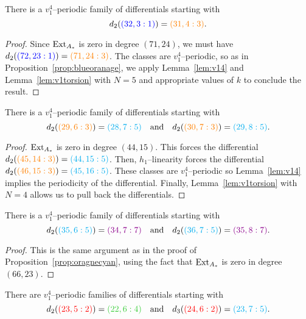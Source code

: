\begin{prop}\label{prop:blueoranage1}
There is a $v_1^4$--periodic family of differentials starting with
\[d_2( {\color{blue}(32,3:1)}) = {\color{orange}(31,4:3)}.\]
\end{prop}
\begin{proof}
Since $\operatorname{Ext}_{A_*}$ is zero in degree $(71,24)$, we must have $d_2( {\color{blue}(72,23:1)}) = {\color{orange}(71,24:3)}$. The classes are $v_1^4$--periodic, so as in Proposition~\ref{prop:blueoranage}, we apply Lemma~\ref{lem:v14} and Lemma~\ref{lem:v1torsion} with $N=5$ and appropriate values of $k$ to conclude the result.
\end{proof}


\begin{prop}\label{prop:oragnecyan}
There is a $v_1^4$--periodic family of differentials starting with
\[d_2( {\color{orange}(29,6:3)}) = {\color{cyan}(28,7:5)} \ \ \ \text{and} \ \ \ d_2( {\color{orange}(30,7:3)}) = {\color{cyan}(29,8:5)}  .\]
\end{prop}
\begin{proof}
$\operatorname{Ext}_{A_*}$ is zero in degree $(44,15)$. This forces the differential $d_2( {\color{orange}(45,14:3)}) = {\color{cyan}(44,15:5)}$. Then, $h_1$--linearity forces the differential $d_2( {\color{orange}(46,15:3)}) = {\color{cyan}(45,16:5)}$. These classes are $v_1^4$--periodic so Lemma~\ref{lem:v14} implies the periodicity of the differential. Finally,  Lemma~\ref{lem:v1torsion} with $N=4$ allows us to pull back the differentials.
\end{proof}

\begin{prop}\label{prop:cyanmagenta}
There is a $v_1^4$--periodic family of differentials starting with
\[d_2( {\color{cyan}(35,6:5)}) = {\color{darkmagenta}(34,7:7)} \ \ \ \text{and} \ \ \ d_2( {\color{cyan}(36,7:5)}) = {\color{darkmagenta}(35,8:7) }  .\]
\end{prop}
\begin{proof}
This is the same argument as in the proof of Proposition~\ref{prop:oragnecyan}, using the fact that
$\operatorname{Ext}_{A_*}$ is zero in degree $(66,23)$.
\end{proof}


\begin{prop}\label{prop:greenred}
There are $v_1^4$--periodic families of differentials starting with
\[d_2( {\color{red}(23,5:2)}) = {\color{limegreen}(22,6:4)} \ \ \ \text{and} \ \ \  d_3( {\color{red}(24,6:2)} ) = {\color{cyan}(23,7:5)}.\]
\end{prop}

